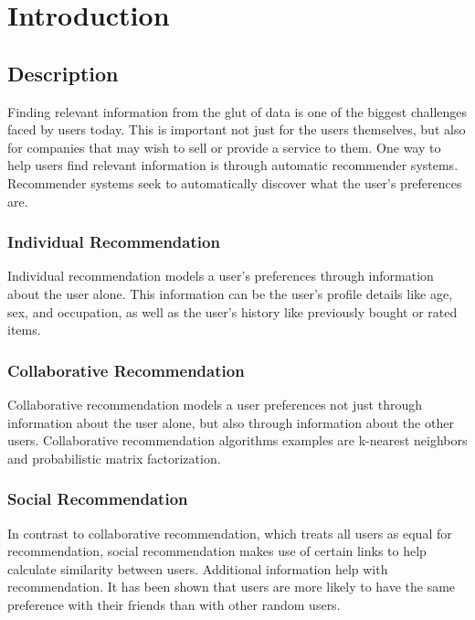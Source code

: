 
\chapter{Introduction}
\label{cha:intro}

\section{Description}

Finding relevant information from the glut of data is one of the biggest challenges faced by users today. This is important not just for the users themselves, but also for companies that may wish to sell or provide a service to them. One way to help users find relevant information is through automatic recommender systems. Recommender systems seek to automatically discover what the user's preferences are.

\subsection{Individual Recommendation}

Individual recommendation models a user's preferences through information about the user alone. This information can be the user's profile details like age, sex, and occupation, as well as the user's history like previously bought or rated items.

\subsection{Collaborative Recommendation}

Collaborative recommendation models a user preferences not just through information about the user alone, but also through information about the other users. Collaborative recommendation algorithms examples are k-nearest neighbors and probabilistic matrix factorization.

\subsection{Social Recommendation}

In contrast to collaborative recommendation, which treats all users as equal for recommendation, social recommendation makes use of certain links to help calculate similarity between users. Additional information help with recommendation. It has been shown that users are more likely to have the same preference with their friends than with other random users.

